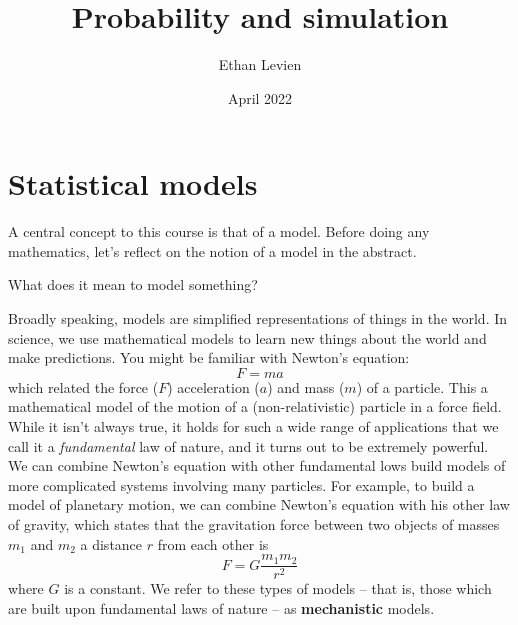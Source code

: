 

\title{\Huge \color{C1} Probability and simulation}
\author{\color{C1} Ethan Levien}
\date{April 2022}



\maketitle

\tableofcontents



\section{Statistical models}
A central concept to this course is that of a {\dfn model}. Before doing any mathematics, let's reflect on the notion of a model in the abstract. 

\begin{exercise}
What does it mean  to model something? 
\end{exercise}




Broadly speaking, models are simplified representations of things in the world. In science, we use {\dfn mathematical models} to learn new things about the world and make predictions. You might be familiar with Newton's equation:
\begin{equation}\label{eq:fma}
F = ma
\end{equation}
which related the force ($F$) acceleration ($a$) and mass ($m$) of a particle. This a mathematical model of the motion of a  (non-relativistic) particle in a force field. While it isn't always true, it holds for such a wide range of applications that we call it a \emph{fundamental} law of nature, and it turns out to be extremely powerful. We can combine Newton's equation with other fundamental lows build models of more complicated systems involving many particles. For example, to build a model of planetary motion, we can combine Newton's equation with his other law of gravity, which states that the gravitation force between two objects of masses $m_1$ and $m_2$ a distance $r$ from each other is 
\begin{equation}
F = G\frac{m_1m_2}{r^2}
\end{equation}
where $G$ is a constant. 
We refer to these types of models -- that is, those which are built upon fundamental laws of nature -- as {\bf mechanistic} models. 


